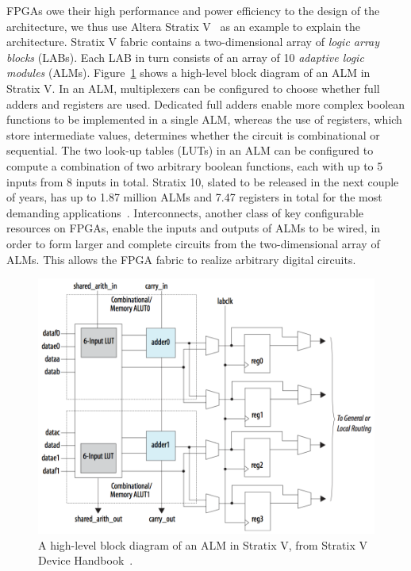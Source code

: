 FPGAs owe their high performance and power efficiency to the design of the
architecture, we thus use Altera Stratix V~\cite{stratix5} as an example to
explain the architecture.  Stratix V fabric contains a two-dimensional array
of \emph{logic array blocks} (LABs).  Each LAB in turn consists of an array
of 10 \emph{adaptive logic modules} (ALMs).  Figure~\ref{bg:fig:alm} shows a
high-level block diagram of an ALM in Stratix V.  In an ALM, multiplexers can
be configured to choose whether full adders and registers are used.  Dedicated
full adders enable more complex boolean functions to be implemented in a
single ALM, whereas the use of registers, which store intermediate values,
determines whether the circuit is combinational or sequential.  The two
look-up tables (LUTs) in an ALM can be configured to compute a combination of
two arbitrary boolean functions, each with up to 5 inputs from 8 inputs in
total.  Stratix 10, slated to be released in the next couple of years, has
up to 1.87 million ALMs and 7.47 registers in total for the most demanding
applications~\cite{stratix10stat}.  Interconnects, another class of key
configurable resources on FPGAs, enable the inputs and outputs of ALMs to be
wired, in order to form larger and complete circuits from the two-dimensional
array of ALMs.  This allows the FPGA fabric to realize arbitrary digital
circuits.
\begin{figure}[ht]
    \centering
    \includegraphics[width=0.8\linewidth]{bg/fig/alm.png}
    \caption{%
        A high-level block diagram of an ALM in Stratix V, from Stratix V
        Device Handbook~\cite{stratix5}.
    }\label{bg:fig:alm}
\end{figure}


